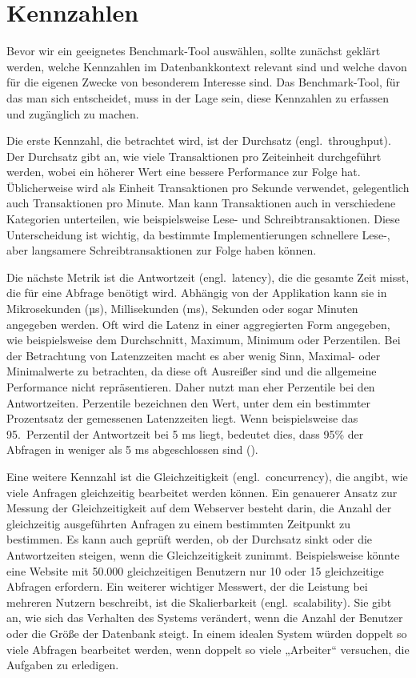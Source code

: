 \section{Kennzahlen}\label{sec:einleitung-kennzahlen}

Bevor wir ein geeignetes Benchmark-Tool auswählen, sollte zunächst geklärt werden, welche Kennzahlen im Datenbankkontext relevant sind und welche davon für die eigenen Zwecke von besonderem Interesse sind.
Das Benchmark-Tool, für das man sich entscheidet, muss in der Lage sein, diese Kennzahlen zu erfassen und zugänglich zu machen.

Die erste Kennzahl, die betrachtet wird, ist der Durchsatz (engl.\ throughput).
Der Durchsatz gibt an, wie viele Transaktionen pro Zeiteinheit durchgeführt werden, wobei ein höherer Wert eine bessere Performance zur Folge hat.
Üblicherweise wird als Einheit Transaktionen pro Sekunde verwendet, gelegentlich auch Transaktionen pro Minute.
Man kann Transaktionen auch in verschiedene Kategorien unterteilen, wie beispielsweise Lese- und Schreibtransaktionen.
Diese Unterscheidung ist wichtig, da bestimmte Implementierungen schnellere Lese-, aber langsamere Schreibtransaktionen zur Folge haben können.

Die nächste Metrik ist die Antwortzeit (engl.\ latency), die die gesamte Zeit misst, die für eine Abfrage benötigt wird.
Abhängig von der Applikation kann sie in Mikrosekunden (µs), Millisekunden (ms), Sekunden oder sogar Minuten angegeben werden.
Oft wird die Latenz in einer aggregierten Form angegeben, wie beispielsweise dem Durchschnitt, Maximum, Minimum oder Perzentilen.
Bei der Betrachtung von Latenzzeiten macht es aber wenig Sinn, Maximal- oder Minimalwerte zu betrachten, da diese oft Ausreißer sind und die allgemeine Performance nicht repräsentieren.
Daher nutzt man eher Perzentile bei den Antwortzeiten.
Perzentile bezeichnen den Wert, unter dem ein bestimmter Prozentsatz der gemessenen Latenzzeiten liegt.
Wenn beispielsweise das 95.\ Perzentil der Antwortzeit bei 5 ms liegt, bedeutet dies, dass 95\% der Abfragen in weniger als 5 ms abgeschlossen sind (\cite{perzentil_erklaerung}).

Eine weitere Kennzahl ist die Gleichzeitigkeit (engl.\ concurrency), die angibt, wie viele Anfragen gleichzeitig bearbeitet werden können.
Ein genauerer Ansatz zur Messung der Gleichzeitigkeit auf dem Webserver besteht darin, die Anzahl der gleichzeitig ausgeführten Anfragen zu einem bestimmten Zeitpunkt zu bestimmen.
Es kann auch geprüft werden, ob der Durchsatz sinkt oder die Antwortzeiten steigen, wenn die Gleichzeitigkeit zunimmt.
Beispielsweise könnte eine Website mit 50.000 gleichzeitigen Benutzern nur 10 oder 15 gleichzeitige Abfragen erfordern.
Ein weiterer wichtiger Messwert, der die Leistung bei mehreren Nutzern beschreibt, ist die Skalierbarkeit (engl.\ scalability).
Sie gibt an, wie sich das Verhalten des Systems verändert, wenn die Anzahl der Benutzer oder die Größe der Datenbank steigt.
In einem idealen System würden doppelt so viele Abfragen bearbeitet werden, wenn doppelt so viele „Arbeiter“ versuchen, die Aufgaben zu erledigen.

